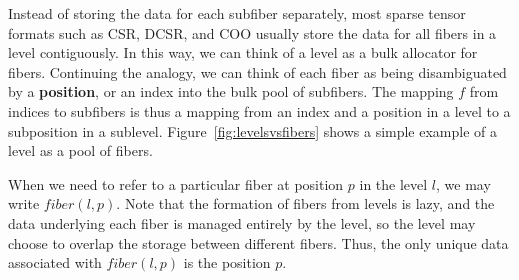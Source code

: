 Instead of storing the data for each subfiber separately, most sparse tensor
formats such as CSR, DCSR, and COO usually store the data for all fibers in a
level contiguously. In this way, we can think of a level as a bulk allocator for
fibers. Continuing the analogy, we can think of each fiber as being
disambiguated by a \textbf{position}, or an index into the bulk pool of
subfibers. The mapping $f$ from indices to subfibers is thus a mapping from an
index and a position in a level to a subposition in a sublevel.
Figure~\ref{fig:levelsvsfibers} shows a simple example of a level as a pool of fibers.

When we need to refer to a particular fiber at position $p$ in the level $l$, we
may write $fiber(l, p)$. Note that the formation of fibers from levels is lazy,
and the data underlying each fiber is managed entirely by the level, so the
level may choose to overlap the storage between different fibers. Thus, the only
unique data associated with $fiber(l, p)$ is the position $p$.
